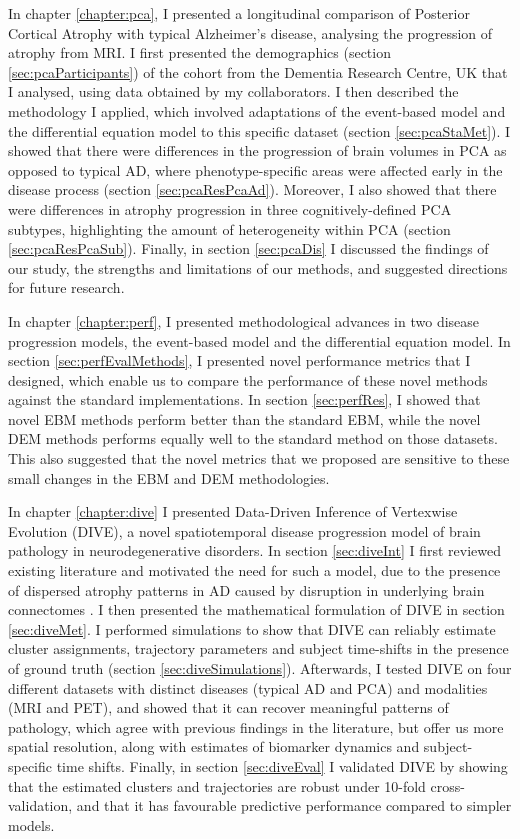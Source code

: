 In chapter \ref{chapter:pca}, I presented a longitudinal comparison of Posterior Cortical Atrophy with typical Alzheimer's disease, analysing the progression of atrophy from MRI. I first presented the demographics (section \ref{sec:pcaParticipants}) of the cohort from the Dementia Research Centre, UK that I analysed, using data obtained by my collaborators. I then described the methodology I applied, which involved adaptations of the event-based model and the differential equation model to this specific dataset (section \ref{sec:pcaStaMet}). I showed that there were differences in the progression of brain volumes in PCA as opposed to  typical AD, where phenotype-specific areas were affected early in the disease process (section \ref{sec:pcaResPcaAd}). Moreover, I also showed that there were differences in atrophy progression in three cognitively-defined PCA subtypes, highlighting the amount of heterogeneity within PCA (section \ref{sec:pcaResPcaSub}). Finally, in section \ref{sec:pcaDis} I discussed the findings of our study, the strengths and limitations of our methods, and suggested directions for future research. 

In chapter \ref{chapter:perf}, I presented methodological advances in two disease progression models, the event-based model and the differential equation model. In section \ref{sec:perfEvalMethods}, I presented novel performance metrics that I designed, which enable us to compare the performance of these novel methods against the standard implementations. In section \ref{sec:perfRes}, I showed that novel EBM methods perform better than the standard EBM, while the novel DEM methods performs equally well to the standard method on those datasets. This also suggested that the novel metrics that we proposed are sensitive to these small changes in the EBM and DEM methodologies. 

In chapter \ref{chapter:dive} I presented Data-Driven Inference of Vertexwise Evolution (DIVE), a novel spatiotemporal disease progression model of brain pathology in neurodegenerative disorders. In section \ref{sec:diveInt} I first reviewed existing literature and motivated the need for such a model, due to the presence of dispersed atrophy patterns in AD caused by disruption in underlying brain connectomes \cite{seeley2009neurodegenerative}. I then presented the mathematical formulation of DIVE in section \ref{sec:diveMet}. I performed simulations to show that DIVE can reliably estimate cluster assignments, trajectory parameters and subject time-shifts in the presence of ground truth (section \ref{sec:diveSimulations}). Afterwards, I tested DIVE on four different datasets with distinct diseases (typical AD and PCA) and modalities (MRI and PET), and showed that it can recover meaningful patterns of pathology, which agree with previous findings in the literature, but offer us more spatial resolution, along with estimates of biomarker dynamics and subject-specific time shifts.  Finally, in section \ref{sec:diveEval} I validated DIVE by showing that the estimated clusters and trajectories are robust under 10-fold cross-validation, and that it has favourable predictive performance compared to simpler models.  

